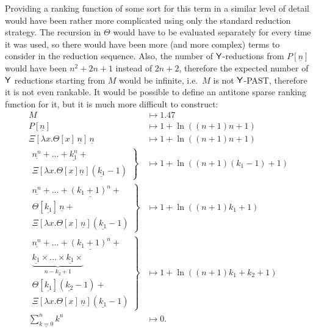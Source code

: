 \begin{example}
Providing a ranking function of some sort for this term in a similar level of detail would have been rather more complicated using only the standard reduction strategy. The recursion in $\Theta$ would have to be evaluated separately for every time it was used, so there would have been more (and more complex) terms to consider in the reduction sequence. Also, the number of $\mathsf{Y}$-reductions from $P[\underline n]$ would have been $n^2 + 2n + 1$ instead of $2n + 2$, therefore the expected number of $\mathsf{Y}$ reductions starting from $M$ would be infinite, i.e.~$M$ is not $\mathsf{Y}$-PAST, therefore it is not even rankable. It would be possible to define an antitone sparse ranking function for it, but it is much more difficult to construct:
\begin{align*}
M & \mapsto 1.47 \\
P[\underline n] & \mapsto 1 + \ln((n+1)n + 1) \\
\Xi[\lambda x. \Theta[x] \, \underline n] \, \underline n & \mapsto 1 + \ln((n+1)n + 1) \\
\left.\begin{array}{r}
\underline{n^n} + \dots + \underline{k_1^n} + {}\\
\Xi[\lambda x. \Theta[x] \underline n] (\underline{k_1} - 1) 
\end{array}\right\} 
& \mapsto 1 + \ln((n+1)(k_1-1)+1) \\
\left.\begin{array}{r}
\underline{n^n} + \dots + \underline{(k_1+1)^n} +  {}\\
\Theta[\underline{k_1}] \, \underline{n} +  {}\\
\Xi[\lambda x. \Theta[x] \, \underline n] (\underline{k_1} - 1) 
\end{array}\right\}
& \mapsto 1 + \ln((n+1)k_1 + 1) \\
\left.\begin{array}{r}\underline{n^n} + \dots + \underline{(k_1+1)^n} + {} \\
\underbrace{\underline{k_1} \times \dots \times \underline{k_1} \times}_{n-k_2+1} {} \\
\Theta[\underline{k_1}] (\underline{k_2} - 1) + {} \\
\Xi[\lambda x. \Theta[x] \, \underline n] (\underline{k_1} - 1)
\end{array}\right\} & \mapsto 1 + \ln((n+1)k_1 + k_2 + 1) \\
\underline{\textstyle\sum_{k=0}^n k^n} & \mapsto 0.
\end{align*}


\end{example}
